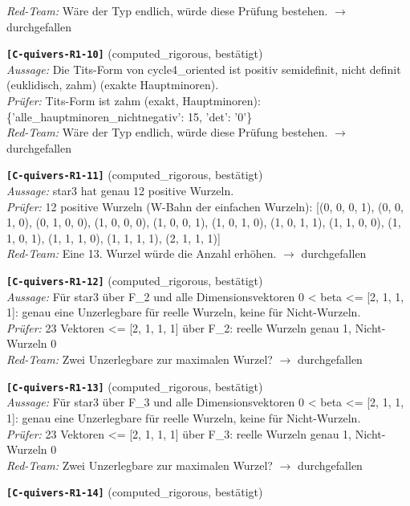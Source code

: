 \documentclass[11pt]{article}
\theoremstyle{definition}\newtheorem{definition}[theorem]{Definition}\newtheorem{remark}[theorem]{Remark}\newtheorem{observation}[theorem]{Numerical observation}
\begin{document}
\textit{Red-Team:} Wäre der Typ endlich, würde diese Prüfung bestehen. $\to$ durchgefallen\par\medskip
\noindent\textbf{\texttt{[C-quivers-R1-10]}} (computed\_rigorous, bestätigt)\\
\textit{Aussage:} Die Tits-Form von cycle4\_oriented ist positiv semidefinit, nicht definit (euklidisch, zahm) (exakte Hauptminoren).\\
\textit{Prüfer:} Tits-Form ist zahm (exakt, Hauptminoren): \{'alle\_hauptminoren\_nichtnegativ': 15, 'det': '0'\}\\
\textit{Red-Team:} Wäre der Typ endlich, würde diese Prüfung bestehen. $\to$ durchgefallen\par\medskip
\noindent\textbf{\texttt{[C-quivers-R1-11]}} (computed\_rigorous, bestätigt)\\
\textit{Aussage:} star3 hat genau 12 positive Wurzeln.\\
\textit{Prüfer:} 12 positive Wurzeln (W-Bahn der einfachen Wurzeln): [(0, 0, 0, 1), (0, 0, 1, 0), (0, 1, 0, 0), (1, 0, 0, 0), (1, 0, 0, 1), (1, 0, 1, 0), (1, 0, 1, 1), (1, 1, 0, 0), (1, 1, 0, 1), (1, 1, 1, 0), (1, 1, 1, 1), (2, 1, 1, 1)]\\
\textit{Red-Team:} Eine 13. Wurzel würde die Anzahl erhöhen. $\to$ durchgefallen\par\medskip
\noindent\textbf{\texttt{[C-quivers-R1-12]}} (computed\_rigorous, bestätigt)\\
\textit{Aussage:} Für star3 über F\_2 und alle Dimensionsvektoren 0 < beta <= [2, 1, 1, 1]: genau eine Unzerlegbare für reelle Wurzeln, keine für Nicht-Wurzeln.\\
\textit{Prüfer:} 23 Vektoren <= [2, 1, 1, 1] über F\_2: reelle Wurzeln genau 1, Nicht-Wurzeln 0\\
\textit{Red-Team:} Zwei Unzerlegbare zur maximalen Wurzel? $\to$ durchgefallen\par\medskip
\noindent\textbf{\texttt{[C-quivers-R1-13]}} (computed\_rigorous, bestätigt)\\
\textit{Aussage:} Für star3 über F\_3 und alle Dimensionsvektoren 0 < beta <= [2, 1, 1, 1]: genau eine Unzerlegbare für reelle Wurzeln, keine für Nicht-Wurzeln.\\
\textit{Prüfer:} 23 Vektoren <= [2, 1, 1, 1] über F\_3: reelle Wurzeln genau 1, Nicht-Wurzeln 0\\
\textit{Red-Team:} Zwei Unzerlegbare zur maximalen Wurzel? $\to$ durchgefallen\par\medskip
\noindent\textbf{\texttt{[C-quivers-R1-14]}} (computed\_rigorous, bestätigt)\\
\end{document}
